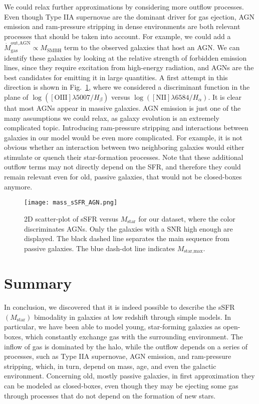 \documentclass[fleqn,usenatbib]{mnras}
\begin{document}
\smallskip
We could relax further approximations by considering more outflow processes. Even though Type IIA supernovae are the dominant driver for gas ejection, AGN emission and ram-pressure stripping in dense environments are both relevant processes that should be taken into account. For example, we could add a $\dot{M}_\text{gas}^\text{out,AGN} \propto M_\text{SMBH}$ term to the observed galaxies that host an AGN. We can identify these galaxies by looking at the relative strength of forbidden emission lines, since they require excitation from high-energy radiation, and AGNs are the best candidates for emitting it in large quantities. A first attempt in this direction is shown in Fig.~\ref{fig:mass_sSFR_AGN.png}, where we considered a discriminant function \citep{Kauffmann_2003_AGN} in the plane of $\log\left(\left[\text{OIII}\right]\lambda 5007 / H_\beta\right)$ versus $\log\left(\left[\text{NII}\right]\lambda 6584 / H_\alpha\right)$. It is clear that most AGNs appear in massive galaxies.
AGN emission is just one of the many assumptions we could relax, as galaxy evolution is an extremely complicated topic.
Introducing ram-pressure stripping and interactions between galaxies in our model would be even more complicated. For example, it is not obvious whether an interaction between two neighboring galaxies would either stimulate or quench their star-formation processes. Note that these additional outflow terms may not directly depend on the SFR, and therefore they could remain relevant even for old, passive galaxies, that would not be closed-boxes anymore.
\begin{figure}\centering
	\texttt{[image: mass\_sSFR\_AGN.png]}
    \caption{2D scatter-plot of sSFR versus $M_\text{star}$ for our dataset, where the color discriminates AGNs. Only the galaxies with a SNR high enough are displayed. The black dashed line separates the main sequence from passive galaxies. The blue dash-dot line indicates $M_\text{star,max}$.}
    \label{fig:mass_sSFR_AGN.png}
\end{figure}



\section{Summary}\label{sec:summary}
In conclusion, we discovered that it is indeed possible to describe the sSFR$(M_\text{star})$ bimodality in galaxies at low redshift through simple models. In particular, we have been able to model young, star-forming galaxies as open-boxes, which constantly exchange gas with the surrounding environment. The inflow of gas is dominated by the halo, while the outflow depends on a series of processes, such as Type IIA supernovae, AGN emission, and ram-pressure stripping, which, in turn, depend on mass, age, and even the galactic environment. Concerning old, mostly passive galaxies, in first approximation they can be modeled as closed-boxes, even though they may be ejecting some gas through processes that do not depend on the formation of new stars.
\end{document}
